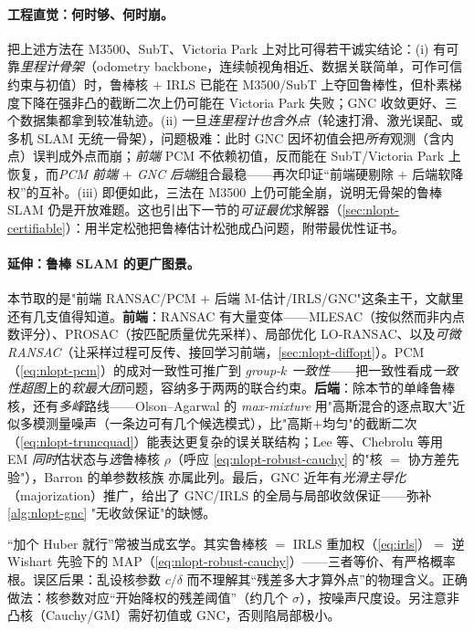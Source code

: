\paragraph{工程直觉：何时够、何时崩。}\cite{carlone2026handbook}
把上述方法在 M3500、SubT、Victoria Park 上对比可得若干诚实结论\cite{carlone2026handbook}：(i) 有可靠\emph{里程计骨架}（odometry backbone，连续帧视角相近、数据关联简单，可作可信约束与初值）时，鲁棒核 $+$ IRLS 已能在 M3500/SubT 上夺回鲁棒性，但朴素梯度下降在强非凸的截断二次上仍可能在 Victoria Park 失败；GNC 收敛更好、三个数据集都拿到较准轨迹。(ii) 一旦\emph{连里程计也含外点}（轮速打滑、激光误配、或多机 SLAM 无统一骨架），问题极难：此时 GNC 因坏初值会把\emph{所有}观测（含内点）误判成外点而崩；\emph{前端} PCM 不依赖初值，反而能在 SubT/Victoria Park 上恢复，而\emph{PCM 前端 $+$ GNC 后端}组合最稳——再次印证“前端硬剔除 $+$ 后端软降权”的互补。(iii) 即便如此，三法在 M3500 上仍可能全崩，说明无骨架的鲁棒 SLAM 仍是开放难题。这也引出下一节的\emph{可证最优}求解器（\cref{sec:nlopt-certifiable}）：用半定松弛把鲁棒估计松弛成凸问题，附带最优性证书。

\paragraph{延伸：鲁棒 SLAM 的更广图景。}\cite{carlone2026handbook}
本节取的是"前端 RANSAC/PCM $+$ 后端 M-估计/IRLS/GNC"这条主干，文献里还有几支值得知道。\textbf{前端}：RANSAC 有大量变体——MLESAC（按似然而非内点数评分）、PROSAC（按匹配质量优先采样）、局部优化 LO-RANSAC、以及\emph{可微 RANSAC}（让采样过程可反传、接回学习前端，\cref{sec:nlopt-diffopt}）。PCM（\cref{eq:nlopt-pcm}）的成对一致性可推广到 \emph{group-$k$ 一致性}——把一致性看成\emph{一致性超图}上的\emph{软最大团}问题，容纳多于两两的联合约束。\textbf{后端}：除本节的单峰鲁棒核，还有\emph{多峰}路线——Olson--Agarwal 的 \emph{max-mixture} 用"高斯混合的逐点取大"近似多模测量噪声（一条边可有几个候选模式），比"高斯$+$均匀"的截断二次（\cref{eq:nlopt-truncquad}）能表达更复杂的误关联结构；Lee 等、Chebrolu 等用 EM \emph{同时}估状态与\emph{选}鲁棒核 $\rho$（呼应 \cref{eq:nlopt-robust-cauchy} 的"核 $=$ 协方差先验"），Barron 的单参数核族\cite{barron2019general} 亦属此列。最后，GNC 近年有\emph{光滑主导化}（majorization）推广，给出了 GNC/IRLS 的全局与局部收敛保证——弥补 \cref{alg:nlopt-gnc} "无收敛保证"的缺憾。

\begin{pitfall}
“加个 Huber 就行”常被当成玄学。其实鲁棒核 $=$ IRLS 重加权（\cref{eq:irls}）$=$ 逆 Wishart 先验下的 MAP（\cref{eq:nlopt-robust-cauchy}）——三者等价、有严格概率根。误区后果：乱设核参数 $c$/$\delta$ 而不理解其“残差多大才算外点”的物理含义。正确做法：核参数对应“开始降权的残差阈值”（约几个 $\sigma$），按噪声尺度设。另注意非凸核（Cauchy/GM）需好初值或 GNC，否则陷局部极小。
\end{pitfall}

